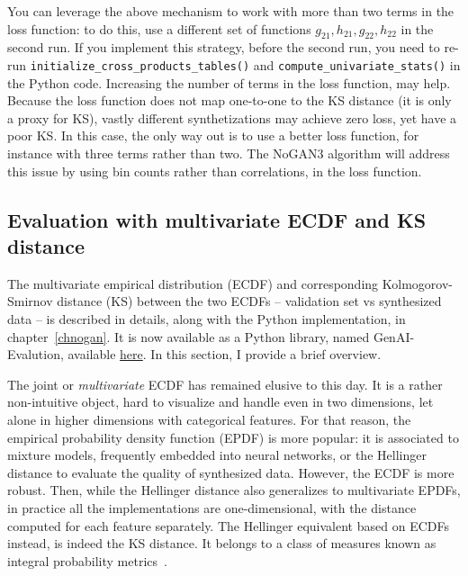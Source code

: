 \documentclass[oneside,10pt]{book}
\begin{document}
You can leverage the above mechanism to work with more than two terms in the loss function: to do this, use a different set of functions
 $g_{21}, h_{21}, g_{22}, h_{22}$ in the second run. If you implement this strategy, before the second run, you need to re-run
 \texttt{initialize\_cross\_products\_tables()}
 and \texttt{compute\_univariate\_stats()} in the Python code.
Increasing the number of terms in the loss function, may help. Because the loss function does not map one-to-one to the KS distance (it is only a proxy for KS),
 vastly different synthetizations may achieve zero loss, yet have a poor KS. In this case, the only way out is to use a better loss function, for instance with three terms rather than two. The NoGAN3 algorithm will address
 this issue by using bin counts rather than correlations, in the loss function.




\subsection{Evaluation with multivariate ECDF and KS distance}\label{bulbdres}




The \textcolor{index}{multivariate empirical distribution} (ECDF) and corresponding
 \textcolor{index}{Kolmogorov-Smirnov distance} (KS) between the two ECDFs -- validation set vs synthesized data -- is described in details, along with the Python implementation, in chapter~\ref{chnogan}. It is now available as a Python library,
 named GenAI-Evalution, available \href{https://pypi.org/project/genai-evaluation/}{here}. In this section, I provide a brief overview.

The joint or {\em multivariate} ECDF has remained elusive to this day. It is a rather non-intuitive object, hard to visualize and handle even in two dimensions, let alone in higher dimensions with categorical features. For that reason, the 
 \textcolor{index}{empirical probability density function} (EPDF) is more popular: it is associated to 
 \textcolor{index}{mixture models}, frequently embedded into neural networks,
  or the \textcolor{index}{Hellinger distance} to evaluate the quality of synthesized data. However, the ECDF is more robust. Then, while the Hellinger distance also generalizes to multivariate EPDFs, in practice all the implementations are one-dimensional, with the distance computed for each feature separately.  The Hellinger equivalent based on ECDFs instead, is indeed the KS distance. It belongs to a class of measures known as 
 \textcolor{index}{integral probability metrics}~\cite{vcxoi54, euclidf12}.
\end{document}
